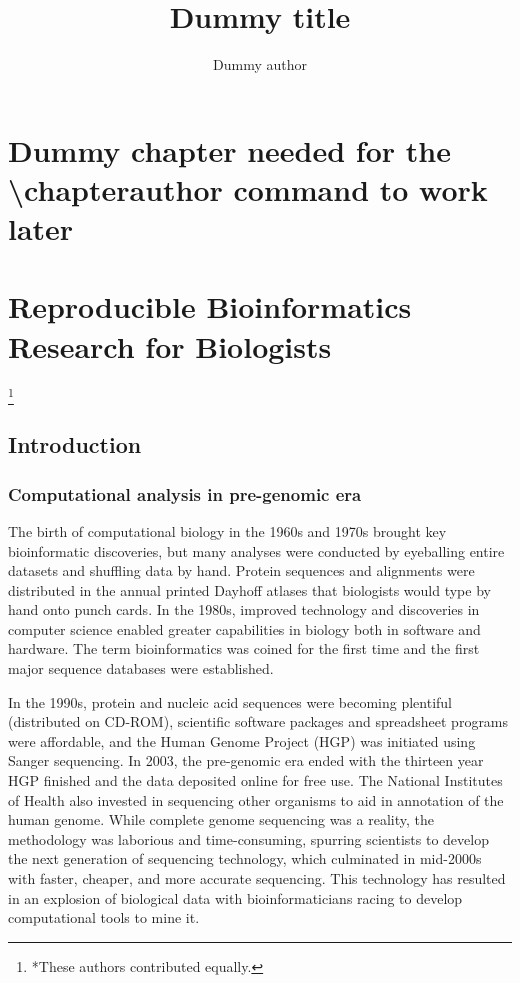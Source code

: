 \documentclass[ChapterTOCs,krantz2]{krantz} %
\begin{document}
\title{Dummy title} \author{Dummy author} \chapter*{Dummy chapter needed for
the \textbackslash chapterauthor command to work later}

\mainmatter



\chapter{Reproducible Bioinformatics Research for Biologists}
\footnote{*These authors contributed equally.}

\section{Introduction}\label{intro}

\subsection{Computational analysis in pre-genomic era}

The birth of computational biology in the 1960s
and 1970s brought key bioinformatic discoveries, but many analyses
were conducted by eyeballing entire datasets and shuffling data by hand.
Protein sequences and alignments were distributed in the annual printed Dayhoff
atlases \cite{Strasser2010}that biologists would type by hand onto punch cards.  In the 1980s,
improved technology and discoveries in computer science enabled greater
capabilities in biology both in software and hardware.  The term bioinformatics
was coined for the first time and the first major sequence databases were
established. 

In the 1990s, protein and nucleic acid sequences were becoming plentiful
(distributed on CD-ROM), scientific software packages and spreadsheet programs
were affordable, and the Human Genome Project (HGP) was initiated using Sanger
sequencing.  In 2003, the pre-genomic era ended with the thirteen year HGP
finished and the data deposited online for free 
use\cite{Lander2001,Collins2003,HGP}.  The National Institutes of Health also
invested in sequencing other organisms to aid in annotation of the 
human genome.  While complete genome
sequencing was a reality, the methodology was laborious and time-consuming,
spurring scientists to develop the next generation of sequencing technology,
which culminated in mid-2000s with faster, cheaper, and more accurate
sequencing\cite{Ansorge2009}. This technology has resulted in an explosion of biological data
with bioinformaticians racing to develop computational tools to mine it.  
\end{document}
